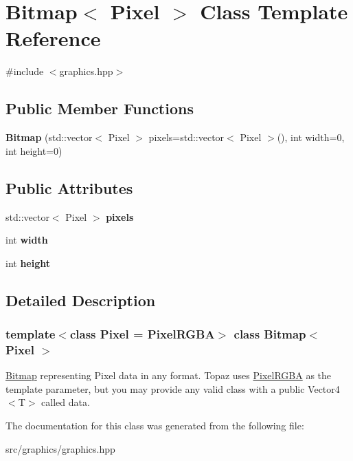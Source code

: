 \hypertarget{class_bitmap}{}\section{Bitmap$<$ Pixel $>$ Class Template Reference}
\label{class_bitmap}


{\ttfamily \#include $<$graphics.\+hpp$>$}

\subsection*{Public Member Functions}
\begin{DoxyCompactItemize}
\item 
\mbox{\label{class_bitmap_a58c9612034bf712ac71d92951c950ff5}} 
{\bfseries Bitmap} (std\+::vector$<$ Pixel $>$ pixels=std\+::vector$<$ Pixel $>$(), int width=0, int height=0)
\end{DoxyCompactItemize}
\subsection*{Public Attributes}
\begin{DoxyCompactItemize}
\item 
\mbox{\label{class_bitmap_acd003dbe23a69571311e6be4149eca51}} 
std\+::vector$<$ Pixel $>$ {\bfseries pixels}
\item 
\mbox{\label{class_bitmap_a8733772b70b8971d11e3eb4eec6970a0}} 
int {\bfseries width}
\item 
\mbox{\label{class_bitmap_a307fcc931419962f442ea32139e75a0b}} 
int {\bfseries height}
\end{DoxyCompactItemize}


\subsection{Detailed Description}
\subsubsection*{template$<$class Pixel = Pixel\+R\+G\+BA$>$\newline
class Bitmap$<$ Pixel $>$}

\mbox{\hyperlink{class_bitmap}{Bitmap}} representing Pixel data in any format. Topaz uses \mbox{\hyperlink{class_pixel_r_g_b_a}{Pixel\+R\+G\+BA}} as the template parameter, but you may provide any valid class with a public Vector4$<$\+T$>$ called \textquotesingle{}data\textquotesingle{}. 

The documentation for this class was generated from the following file\+:\begin{DoxyCompactItemize}
\item 
src/graphics/graphics.\+hpp\end{DoxyCompactItemize}

